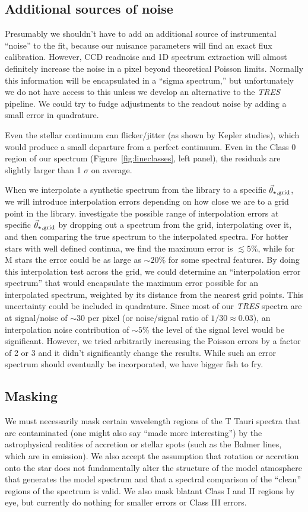 \documentclass[preprint]{aastex} %
\newcommand{\vt}{\vec{\theta}}
\newcommand{\vg}{\vt_{\star, {\rm grid}}}
\begin{document}
\subsection{Additional sources of noise}
Presumably we shouldn't have to add an additional source of instrumental ``noise'' to the fit, because our nuisance parameters will find an exact flux calibration. However, CCD readnoise and 1D spectrum extraction will almost definitely increase the noise in a pixel beyond theoretical Poisson limits. Normally this information will be encapsulated in a ``sigma spectrum,'' but unfortunately we do not have access to this unless we develop an alternative to the \emph{TRES} pipeline. We could try to fudge adjustments to the readout noise by adding a small error in quadrature.

Even the stellar continuum can flicker/jitter (as shown by Kepler studies), which would produce a small departure from a perfect continuum. Even in the Class 0 region of our spectrum (Figure~\ref{fig:lineclasses}, left panel), the residuals are slightly larger than 1 $\sigma$ on average.

When we interpolate a synthetic spectrum from the library to a specific $\vg$, we will introduce interpolation errors depending on how close we are to a grid point in the library. \citet{hus12} investigate the possible range of interpolation errors at specific $\vg$ by dropping out a spectrum from the grid, interpolating over it, and then comparing the true spectrum to the interpolated spectra. For hotter stars with well defined continua, we find the maximum error is $\lesssim 5$\%, while for M stars the error could be as large as $\sim 20$\% for some spectral features. By doing this interpolation test across the grid, we could determine an ``interpolation error spectrum'' that would encapsulate the maximum error possible for an interpolated spectrum, weighted by its distance from the nearest grid points. This uncertainty could be included in quadrature. Since most of our \emph{TRES} spectra are at signal/noise of $\sim 30$ per pixel (or noise/signal ratio of $1/30 \approx 0.03$), an interpolation noise contribution of $\sim 5$\% the level of the signal level would be significant. However, we tried arbitrarily increasing the Poisson errors by a factor of 2 or 3 and it didn't significantly change the results. While such an error spectrum should eventually be incorporated, we have bigger fish to fry. 

\subsection{Masking}
We must necessarily mask certain wavelength regions of the T Tauri spectra that are contaminated (one might also say ``made more interesting'') by the astrophysical realities of accretion or stellar spots (such as the Balmer lines, which are in emission).  We also accept the assumption that rotation or accretion onto the star does not fundamentally alter the structure of the model atmosphere that generates the model spectrum and that a spectral comparison of the ``clean'' regions of the spectrum is valid. We also mask blatant Class I and II regions by eye, but currently do nothing for smaller errors or Class III errors.
\end{document}
